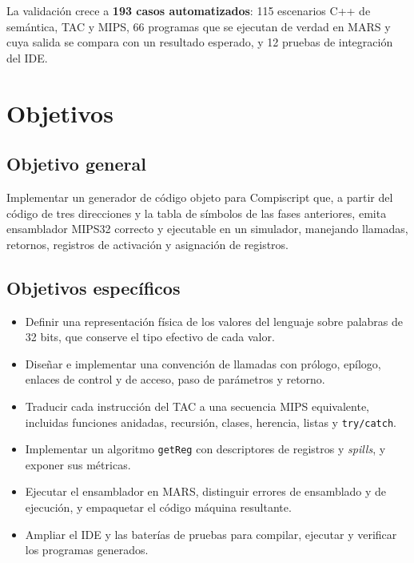 \documentclass[11pt,a4paper]{article}
\begin{document}
La validación crece a \textbf{193 casos automatizados}: 115 escenarios C++ de
semántica, TAC y MIPS, 66 programas que se ejecutan de verdad en MARS y cuya
salida se compara con un resultado esperado, y 12 pruebas de integración del
IDE.

\section{Objetivos}

\subsection{Objetivo general}

Implementar un generador de código objeto para Compiscript que, a partir del
código de tres direcciones y la tabla de símbolos de las fases anteriores,
emita ensamblador MIPS32 correcto y ejecutable en un simulador, manejando
llamadas, retornos, registros de activación y asignación de registros.

\subsection{Objetivos específicos}

\begin{itemize}[leftmargin=1.4em]
  \item Definir una representación física de los valores del lenguaje sobre
        palabras de 32 bits, que conserve el tipo efectivo de cada valor.
  \item Diseñar e implementar una convención de llamadas con prólogo, epílogo,
        enlaces de control y de acceso, paso de parámetros y retorno.
  \item Traducir cada instrucción del TAC a una secuencia MIPS equivalente,
        incluidas funciones anidadas, recursión, clases, herencia, listas y
        \texttt{try/catch}.
  \item Implementar un algoritmo \texttt{getReg} con descriptores de registros
        y \emph{spills}, y exponer sus métricas.
  \item Ejecutar el ensamblador en MARS, distinguir errores de ensamblado y de
        ejecución, y empaquetar el código máquina resultante.
  \item Ampliar el IDE y las baterías de pruebas para compilar, ejecutar y
        verificar los programas generados.
\end{itemize}
\end{document}
